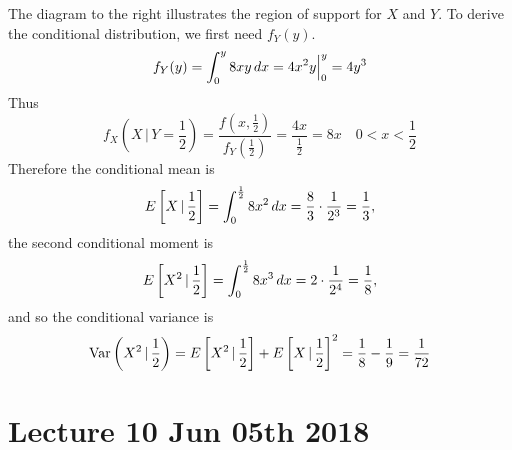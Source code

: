\documentclass[notoc,notitlepage]{tufte-book}
\begin{document}
\begin{solution}
  The diagram to the right illustrates the region of support for $X$ and $Y$.
  To derive the conditional distribution, we first need $f_Y(y)$.
  \begin{equation*}
    f_Y(y) = \int_{0}^{y} 8xy \mathop{}\!d{x} = 4x^2y \Big|_{0}^{y} = 4y^3
  \end{equation*}
  Thus
  \begin{equation*}
    f_X \left(X \, | \, Y = \frac{1}{2}\right) = \frac{f\left(x, \frac{1}{2}\right)}{f_Y\left(\frac{1}{2}\right)} = \frac{4x}{\frac{1}{2}} = 8x \quad 0 < x < \frac{1}{2}
  \end{equation*}
  Therefore the conditional mean is
  \begin{equation*}
    E\left[ X  \, | \, \frac{1}{2} \right] = \int_{0}^{\frac{1}{2}} 8x^2 \mathop{}\!d{x} = \frac{8}{3} \cdot \frac{1}{2^3} = \frac{1}{3},
  \end{equation*}
  the second conditional moment is
  \begin{equation*}
    E \left[ X^2 \, | \, \frac{1}{2} \right] = \int_{0}^{\frac{1}{2}} 8x^3 \mathop{}\!d{x} = 2 \cdot \frac{1}{2^4} = \frac{1}{8},
  \end{equation*}
  and so the conditional variance is
  \begin{equation*}
    \operatorname{Var} \left( X^2 \, | \, \frac{1}{2} \right) = E\left[ X^2 \, | \, \frac{1}{2} \right] + E\left[ X \, | \, \frac{1}{2} \right]^2 = \frac{1}{8} - \frac{1}{9} = \frac{1}{72}
  \end{equation*}
\end{solution}




\chapter{Lecture 10 Jun 05th 2018}%
\label{chp:lecture_10_jun_05th_2018}
\end{document}
